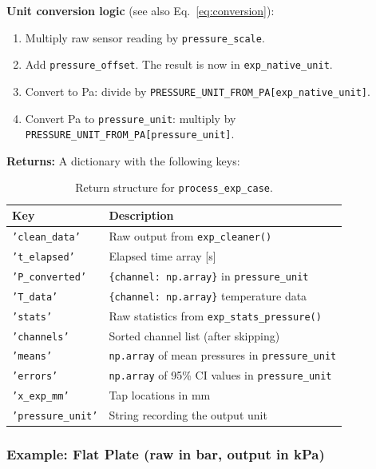 \documentclass[11pt, letterpaper]{article}
\begin{document}
\textbf{Unit conversion logic} (see also Eq.~\ref{eq:conversion}):

\begin{enumerate}[nosep]
    \item Multiply raw sensor reading by \texttt{pressure\_scale}.
    \item Add \texttt{pressure\_offset}. The result is now in
          \texttt{exp\_native\_unit}.
    \item Convert to Pa: divide by
          \texttt{PRESSURE\_UNIT\_FROM\_PA[exp\_native\_unit]}.
    \item Convert Pa to \texttt{pressure\_unit}: multiply by
          \texttt{PRESSURE\_UNIT\_FROM\_PA[pressure\_unit]}.
\end{enumerate}

\textbf{Returns:} A dictionary with the following keys:

\begin{table}[h!]
\centering
\caption{Return structure for \texttt{process\_exp\_case}.}
\begin{tabular}{@{}lp{9cm}@{}}
\toprule
\textbf{Key} & \textbf{Description} \\
\midrule
\texttt{'clean\_data'}    & Raw output from \texttt{exp\_cleaner()} \\
\texttt{'t\_elapsed'}     & Elapsed time array [s] \\
\texttt{'P\_converted'}   & \texttt{\{channel: np.array\}} in \texttt{pressure\_unit} \\
\texttt{'T\_data'}        & \texttt{\{channel: np.array\}} temperature data \\
\texttt{'stats'}          & Raw statistics from \texttt{exp\_stats\_pressure()} \\
\texttt{'channels'}       & Sorted channel list (after skipping) \\
\texttt{'means'}          & \texttt{np.array} of mean pressures in \texttt{pressure\_unit} \\
\texttt{'errors'}         & \texttt{np.array} of 95\% CI values in \texttt{pressure\_unit} \\
\texttt{'x\_exp\_mm'}     & Tap locations in mm \\
\texttt{'pressure\_unit'} & String recording the output unit \\
\bottomrule
\end{tabular}
\end{table}

\subsubsection*{Example: Flat Plate (raw in bar, output in kPa)}
\end{document}
